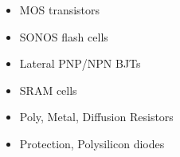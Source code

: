 \documentclass[10pt,a4paper]{article}
\begin{document}
\begin{minipage}[t]{0.45\textwidth}
	\begin{itemize}[itemsep=0pt]
		\item MOS transistors
		\item SONOS flash cells
		\item Lateral PNP/NPN BJTs
	\end{itemize}
\end{minipage}\hspace{20pt}\begin{minipage}[t]{0.45\textwidth}
	\begin{itemize}[itemsep=0pt]
		\item SRAM cells
		\item Poly, Metal, Diffusion Resistors
		\item Protection, Polysilicon diodes
	\end{itemize}
\end{minipage}
\end{document}
